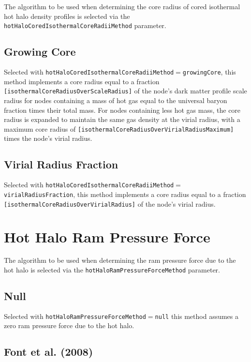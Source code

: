 The algorithm to be used when determining the core radius of cored isothermal hot halo density profiles is selected via the {\tt hotHaloCoredIsothermalCoreRadiiMethod} parameter.

\subsection{Growing Core}

Selected with {\tt hotHaloCoredIsothermalCoreRadiiMethod}$=${\tt growingCore}, this method implements a core radius equal to a fraction {\tt [isothermalCoreRadiusOverScaleRadius]} of the node's dark matter profile scale radius for nodes containing a mass of hot gas equal to the universal baryon fraction times their total mass. For nodes containing less hot gas mass, the core radius is expanded to maintain the same gas density at the virial radius, with a maximum core radius of {\tt [isothermalCoreRadiusOverVirialRadiusMaximum]} times the node's virial radius.

\subsection{Virial Radius Fraction}

Selected with {\tt hotHaloCoredIsothermalCoreRadiiMethod}$=${\tt virialRadiusFraction}, this method implements a core radius equal to a fraction {\tt [isothermalCoreRadiusOverVirialRadius]} of the node's virial radius.

\section{Hot Halo Ram Pressure Force}\label{sec:HotHaloRamPressureForce}

The algorithm to be used when determining the ram pressure force due to the hot halo is selected via the {\tt hotHaloRamPressureForceMethod} parameter.

\subsection{Null}

Selected with {\tt hotHaloRamPressureForceMethod}$=${\tt null} this method assumes a zero ram pressure force due to the hot halo.

\subsection{Font et al. (2008)}

